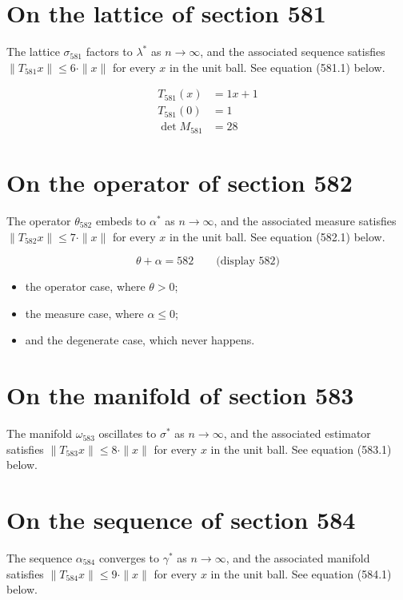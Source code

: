\documentclass{article}
\begin{document}
\section{On the lattice of section 581}
The lattice $\sigma_{581}$ factors to $\lambda^{*}$ as $n \to \infty$,
and the associated sequence satisfies $\|T_{581} x\| \leq 6 \cdot \|x\|$
for every $x$ in the unit ball. See equation (581.1) below.

\begin{align}
T_{581}(x) &= 1 x + 1 \\
T_{581}(0) &= 1 \\
\det M_{581} &= 28
\end{align}

\section{On the operator of section 582}
The operator $\theta_{582}$ embeds to $\alpha^{*}$ as $n \to \infty$,
and the associated measure satisfies $\|T_{582} x\| \leq 7 \cdot \|x\|$
for every $x$ in the unit ball. See equation (582.1) below.

$$
\theta + \alpha = 582 \qquad \text{(display 582)}
$$

\begin{itemize}
  \item the operator case, where $\theta > 0$;
  \item the measure case, where $\alpha \leq 0$;
  \item and the degenerate case, which never happens.
\end{itemize}

\section{On the manifold of section 583}
The manifold $\omega_{583}$ oscillates to $\sigma^{*}$ as $n \to \infty$,
and the associated estimator satisfies $\|T_{583} x\| \leq 8 \cdot \|x\|$
for every $x$ in the unit ball. See equation (583.1) below.

\section{On the sequence of section 584}
The sequence $\alpha_{584}$ converges to $\gamma^{*}$ as $n \to \infty$,
and the associated manifold satisfies $\|T_{584} x\| \leq 9 \cdot \|x\|$
for every $x$ in the unit ball. See equation (584.1) below.
\end{document}
